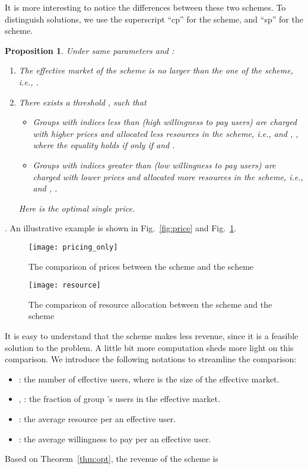 \documentclass[twocolumn,10pt,twosided]{IEEEtran}
\newtheorem{proposition}{Proposition}
\newcommand{\ie}{\emph{i.e., }}
\begin{document}
It is more interesting to notice the differences between these two schemes.  To distinguish solutions, we use the superscript ``cp'' for the  scheme, and ``sp'' for the  scheme.
\begin{proposition}
\label{pro:comparison_sp_cd}
Under same parameters  and :
\begin{enumerate}
    \item The effective market of the  scheme is no larger than the one of the  scheme, i.e.,
    .
     \item
There exists a threshold , such that 
\begin{itemize}
    \item  Groups with indices less than  ({high} willingness to pay users) are charged with higher prices and allocated less resources in {the  scheme}, \ie
 and , ,  where the equality holds if only if  and .
     \item Groups with indices greater than  ({low} willingness to pay users) are charged with lower prices and allocated more resources {in the  scheme}, \ie
 and , .
\end{itemize}
Here  is the optimal single price.
\end{enumerate}
\end{proposition}
. An illustrative example is shown in Fig.~\ref{fig:price} and Fig.~\ref{fig:resource}.
\begin{figure}[ht]
\centering
\texttt{[image: pricing\_only]}
\caption{The comparison of prices between the  scheme and the  scheme} \label{fig:price}
\texttt{[image: resource]}
\caption{The comparison of resource allocation between the  scheme and the  scheme}
\label{fig:resource}
\end{figure}

It is easy to understand that the  scheme makes less revenue, since it is a feasible solution to the  problem. A little bit more computation sheds more light on this comparison.
We introduce the following notations to streamline the comparison:
\begin{itemize}
    \item : the number of effective users, where  is the size of the effective market.
     \item , : the fraction of group 's users in the  effective market.
     \item : the average resource per an effective user.
     \item : the average willingness to pay per an effective user.
\end{itemize}
Based on Theorem~\ref{thm:opt},  the revenue of the  scheme is
\end{document}
